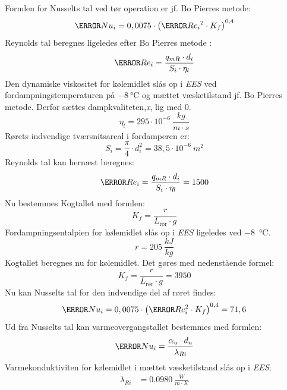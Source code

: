 \documentclass[../Hovedrapport.tex]{subfiles}
\begin{document}
Formlen for Nusselts tal ved tør operation er jf. Bo Pierres metode:
\begin{equation}
\V{Nu_i}  = 0,0075 \cdot   \left( \V{{Re} _{i}}^{2} \cdot  K_{f} \right) ^{0,4}
\end{equation}
Reynolds tal beregnes ligeledes efter Bo Pierres metode \citep{koleteknik}:
\begin{equation}
\V{Re} _{i} = \frac{q_{mR} \cdot d_{i}}{ S_{i} \cdot  \eta_{l}}
\end{equation}
Den dynamiske viskositet for kølemidlet slås op i \textit{EES} ved fordampningstemperaturen på $\SI{-8}{\celsius}$ og mættet væsketilstand  jf. Bo Pierres metode. Derfor sættes dampkvaliteten,\textit{x}, lig med 0.
\begin{equation}
\si{\eta_{l}} =295\cdot 10^{-6} \SI{}{\frac{kg}{m \cdot s}}
\end{equation}
Rørets indvendige tværsnitsareal i fordamperen er:
\begin{equation}
S_{i} = \frac{\pi}{4}\cdot  d_{i}^{2} = 38,5\cdot 10^{-6}\SI{}{m^2}
\end{equation}
Reynolds tal kan hernæst beregnes:
\begin{equation}
\V{Re} _{i} = \frac{q_{mR} \cdot d_{i}}{ S_{i} \cdot  \eta_{l}} = 1500
\end{equation}
Nu bestemmes Kogtallet med formlen:
\begin{equation}    
K_{f} = \frac {r}{ L_{\text{rør}}\cdot g}
\end{equation}
Fordampningsentalpien for kølemidlet slås op i \textit{EES} ligeledes ved \SI{-8}{\celsius}.
\begin{equation}
r = \SI{205}{\frac{kJ}{kg}} 
\end{equation}
Kogtallet beregnes nu for kølemidlet. Det gøres med nedenstående formel:
\begin{equation}    
K_{f} = \frac {r}{ L_{\text{rør}}\cdot g} = 3950
\end{equation}
Nu kan Nusselts tal for den indvendige del af røret findes:
\begin{equation}
\V{Nu_i}  = 0,0075 \cdot   \left( \V{Re} _{i}^{2} \cdot  K_{f} \right) ^{0,4} = 71,6
\end{equation}
Ud fra Nusselts tal kan varmeovergangstallet bestemmes med formlen:
\begin{equation}
    \V{Nu_i}  = \frac{\alpha_{u} \cdot  d_{u}}{\lambda_{Ri}}
\end{equation}
Varmekonduktiviten for kølemidlet i mættet væsketilstand slås op i \textit{EES};
\begin{align}
\lambda_{Ri} &= \SI{0,0980}{\frac{W}{m \cdot K}}
\end{align}
\end{document}
